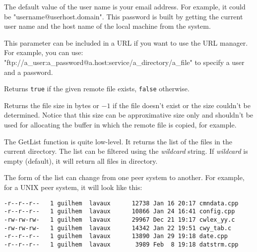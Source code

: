 The default value of the user name is your email address. For example, it could
be "username@userhost.domain". This password is built by getting the current
user name and the host name of the local machine from the system.


This parameter can be included in a URL if you want to use the URL manager.
For example, you can use: "ftp://a\_user:a\_password@a.host:service/a\_directory/a\_file"
to specify a user and a password.



\label{wxftpfileexists}


Returns {\tt true} if the given remote file exists, {\tt false} otherwise.


\label{wxftpgetfilesize}


Returns the file size in bytes or $-1$ if the file doesn't exist or the size
couldn't be determined. Notice that this size can be approximative size only
and shouldn't be used for allocating the buffer in which the remote file is
copied, for example.


\label{wxftpgetdirlist}


The GetList function is quite low-level. It returns the list of the files in
the current directory. The list can be filtered using the {\it wildcard} string.
If {\it wildcard} is empty (default), it will return all files in directory.

The form of the list can change from one peer system to another. For example,
for a UNIX peer system, it will look like this:

\begin{verbatim}
-r--r--r--   1 guilhem  lavaux      12738 Jan 16 20:17 cmndata.cpp
-r--r--r--   1 guilhem  lavaux      10866 Jan 24 16:41 config.cpp
-rw-rw-rw-   1 guilhem  lavaux      29967 Dec 21 19:17 cwlex_yy.c
-rw-rw-rw-   1 guilhem  lavaux      14342 Jan 22 19:51 cwy_tab.c
-r--r--r--   1 guilhem  lavaux      13890 Jan 29 19:18 date.cpp
-r--r--r--   1 guilhem  lavaux       3989 Feb  8 19:18 datstrm.cpp
\end{verbatim}


